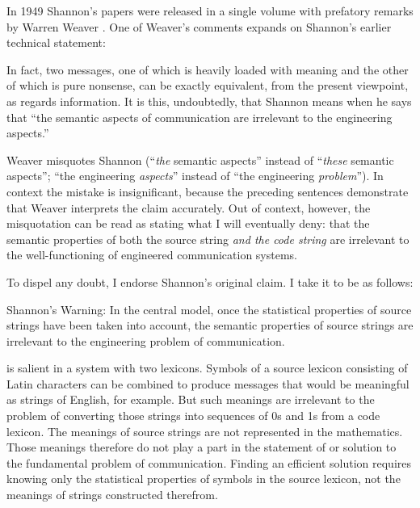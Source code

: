 In 1949 Shannon's papers were released in a single volume with prefatory remarks by Warren Weaver \citep{shannon1949mathematical}.
One of Weaver's comments expands on Shannon's earlier technical statement:

\begin{myquote}
In fact, two messages, one of which is heavily loaded with meaning and the other of which is pure nonsense, can be exactly equivalent, from the present viewpoint, as regards information. It is this, undoubtedly, that Shannon means when he says that ``the semantic aspects of communication are irrelevant to the engineering aspects.''
\par\hspace*{\fill}\citet[8]{shannon1949mathematical}
\end{myquote}

\noindent Weaver misquotes Shannon (``\emph{the} semantic aspects'' instead of ``\emph{these} semantic aspects''; ``the engineering \textit{aspects}'' instead of ``the engineering \textit{problem}'').
In context the mistake is insignificant, because the preceding sentences demonstrate that Weaver interprets the claim accurately.
Out of context, however, the misquotation can be read as stating what I will eventually deny: that the semantic properties of both the source string \textit{and the code string} are irrelevant to the well-functioning of engineered communication systems.

To dispel any doubt, I endorse Shannon's original claim.
I take it to be as follows:

\begin{myquote}
{\sc Shannon's Warning}: In the central model, once the statistical properties of source strings have been taken into account, the semantic properties of source strings are irrelevant to the engineering problem of communication.
\end{myquote}

 is salient in a system with two lexicons.
Symbols of a source lexicon consisting of Latin characters can be combined to produce messages that would be meaningful as strings of English, for example.
But such meanings are irrelevant to the problem of converting those strings into sequences of 0s and 1s from a code lexicon.
The meanings of source strings are not represented in the mathematics.
Those meanings therefore do not play a part in the statement of or solution to the fundamental problem of communication.
Finding an efficient solution requires knowing only the statistical properties of symbols in the source lexicon, not the meanings of strings constructed therefrom.

